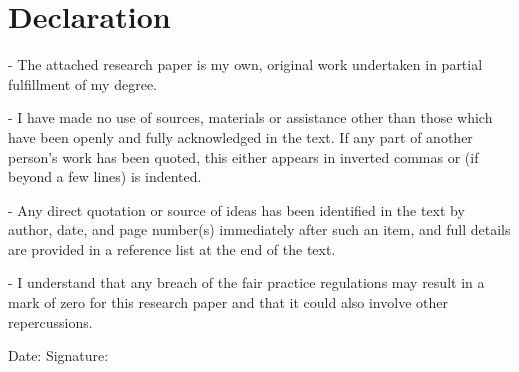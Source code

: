 \chapter*{Declaration}
\label{ch:declaration}

\begin{flushleft}
- The attached research paper is my own, original work undertaken in partial fulfillment of my degree.
\end{flushleft}

\begin{flushleft}
- I have made no use of sources, materials or assistance other than those which have been openly and fully acknowledged in the text. If any part of another person’s work has been quoted, this either appears in inverted commas or (if beyond a few lines) is indented.
\end{flushleft}

\begin{flushleft}
- Any direct quotation or source of ideas has been identified in the text by author, date, and page number(s) immediately after such an item, and full details are provided in a reference list at the end of the text.
\end{flushleft}

\begin{flushleft}
- I understand that any breach of the fair practice regulations may result in a mark of zero for this research paper and that it could also involve other repercussions.
\end{flushleft}

\vspace{1.5cm}

Date:	\hrulefill\enspace Signature: \hrulefill
\\[3.5cm]

